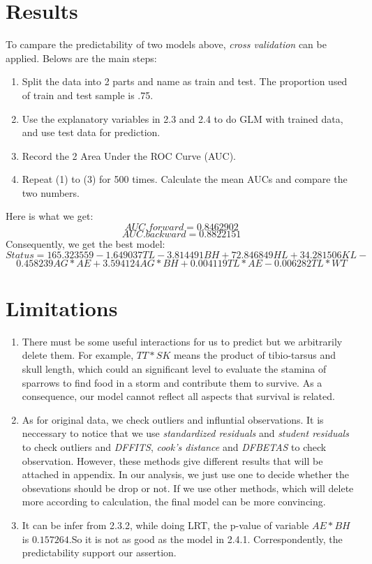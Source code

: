 \documentclass[12pt,a4paper]{article}
\begin{document}
\section{Results}
To campare the predictability of two models above, \emph{cross validation} can be applied. Belows are the main steps:
\begin{enumerate}
\item Split the data into 2 parts and name as train and test. The proportion used of train and test sample is .75.
\item Use the explanatory variables in 2.3 and 2.4 to do GLM with trained data, and use test data for prediction.
\item Record the 2 Area Under the ROC Curve (AUC). 
\item Repeat (1) to (3) for 500 times. Calculate the mean AUCs and compare the two numbers.
\end{enumerate}
Here is what we get:
\[AUC.forward = 0.8462902\]
\[AUC.backward = 0.8822151\]
Consequently, we get the best model:
\[Status = 165.323559 - 1.649037TL - 3.814491BH + 72.846849HL + 34.281506KL -\]
 \[0.458239AG*AE + 3.594124AG*BH + 0.004119TL*AE - 0.006282TL*WT\]
\section{Limitations}
\begin{enumerate}
\item There must be some useful interactions for us to predict but we arbitrarily delete them. For example, $TT*SK$ means the product of tibio-tarsus and skull length, which could an significant level to evaluate the stamina of sparrows to find food in a storm and contribute them to survive. As a consequence, our model cannot reflect all aspects that survival is related.
\item As for original data, we check outliers and influntial observations. It is neccessary to notice that we use \emph{standardized residuals} and \emph{student residuals} to check outliers and \emph{DFFITS}, \emph{cook's distance} and \emph{DFBETAS} to check observation. However, these methods give dif{}ferent results that will be attached in appendix. In our analysis, we just use one to decide whether the obsevations should be drop or not. If we use other methods, which will delete more according to calculation, the final model can be more convincing.
\item It can be infer from 2.3.2, while doing LRT, the p-value of variable $AE*BH$ is $0.157264$.So it is not as good as the model in 2.4.1. Correspondently, the predictability support our assertion.
\end{enumerate}
\end{document}
